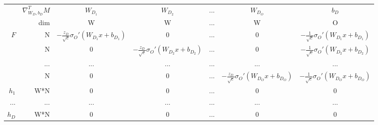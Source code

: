 \begin{table}
\begin{subtable}{\textwidth}
{\begin{tabular}{r r | c c c c c}
& $\nabla^T_{W_D,b_D}M$ & $W_{D_1}$ &  $W_{D_2}$  &...&  $W_{D_O}$ & $b_D$ \\
& dim & W & W &...& W & O \\ \hline
$F$ & N & $-\frac{z_D}{\sqrt{c}}\sigma_O'(W_{D_1}x+b_{D_1})$ & 0 &...& 0 & $-\frac{1}{\sqrt{c}}\sigma_O'(W_{D_1}x+b_{D_1})$ \\
    & N & 0 & $-\frac{z_D}{\sqrt{c}}\sigma_O'(W_{D_2}x+b_{D_2})$ &...& 0 & $-\frac{1}{\sqrt{c}}\sigma_O'(W_{D_2}x+b_{D_2})$ \\
      &...&...&...&...&...&... \\
    & N & 0 & 0 &...& $-\frac{z_D}{\sqrt{c}}\sigma_O'(W_{D_O}x+b_{D_O})$ & $-\frac{1}{\sqrt{c}}\sigma_O'(W_{D_O}x+b_{D_O})$ \\ \hline
$h_1$ & W*N & 0 & 0 &...& 0 & 0 \\
...   & ... &...&...&...&...&...\\ 
$h_{D}$ & W*N & 0 & 0 &...& 0 & 0 \\ \hline
      
\end{tabular}}
\end{subtable}



\end{table}
